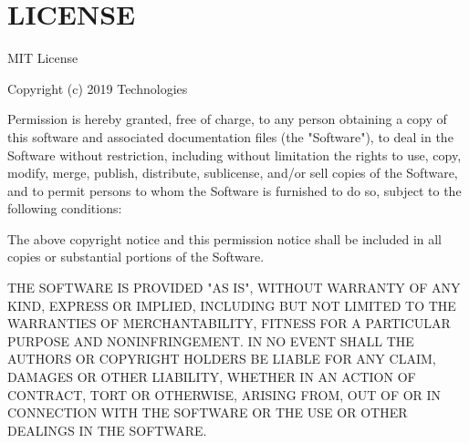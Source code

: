 \chapter{LICENSE}
\hypertarget{md__hey_tea_9_2_library_2_package_cache_2com_8unity_8ide_8vscode_0d1_82_85_2_l_i_c_e_n_s_e}{}\label{md__hey_tea_9_2_library_2_package_cache_2com_8unity_8ide_8vscode_0d1_82_85_2_l_i_c_e_n_s_e}
MIT License

Copyright (c) 2019  Technologies

Permission is hereby granted, free of charge, to any person obtaining a copy of this software and associated documentation files (the "{}\+Software"{}), to deal in the Software without restriction, including without limitation the rights to use, copy, modify, merge, publish, distribute, sublicense, and/or sell copies of the Software, and to permit persons to whom the Software is furnished to do so, subject to the following conditions\+:

The above copyright notice and this permission notice shall be included in all copies or substantial portions of the Software.

THE SOFTWARE IS PROVIDED "{}\+AS IS"{}, WITHOUT WARRANTY OF ANY KIND, EXPRESS OR IMPLIED, INCLUDING BUT NOT LIMITED TO THE WARRANTIES OF MERCHANTABILITY, FITNESS FOR A PARTICULAR PURPOSE AND NONINFRINGEMENT. IN NO EVENT SHALL THE AUTHORS OR COPYRIGHT HOLDERS BE LIABLE FOR ANY CLAIM, DAMAGES OR OTHER LIABILITY, WHETHER IN AN ACTION OF CONTRACT, TORT OR OTHERWISE, ARISING FROM, OUT OF OR IN CONNECTION WITH THE SOFTWARE OR THE USE OR OTHER DEALINGS IN THE SOFTWARE. 